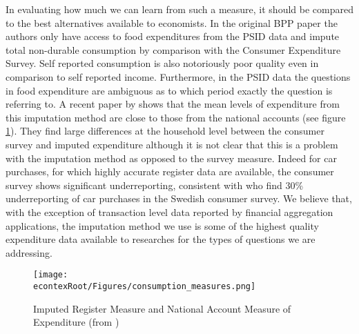 \documentclass[titlepage]{\econtex}\newcommand{\texname}{ConsumptionHeterogeneity}
\begin{document}
In evaluating how much we can learn from such a measure, it should be compared to the best alternatives available to economists. In the original BPP paper the authors only have access to food expenditures from the PSID data and impute total non-durable consumption by comparison with the Consumer Expenditure Survey. Self reported consumption is also notoriously poor quality even in comparison to self reported income. Furthermore, in the PSID data the questions in food expenditure are ambiguous as to which period exactly the question is referring to. A recent paper by \cite{abildgren_consistency_2018} shows that the mean levels of expenditure from this imputation method are close to those from the national accounts (see figure \ref{fig:ConsumptionMeasures}). They find large differences at the household level between the consumer survey and imputed expenditure although it is not clear that this is a problem with the imputation method as opposed to the survey measure. Indeed for car purchases, for which highly accurate register data are available, the consumer survey shows significant underreporting, consistent with \cite{koijen_judging_2014} who find 30\% underreporting of car purchases in the Swedish consumer survey. We believe that, with the exception of transaction level data reported by financial aggregation applications, the imputation method we use is some of the highest quality expenditure data available to researches for the types of questions we are addressing.
\begin{figure} 
	\begin{centering}
		\texttt{[image: \\econtexRoot/Figures/consumption\_measures.png]} 
		\caption{Imputed Register Measure and National Account Measure of Expenditure (from \cite{abildgren_consistency_2018})}
		\label{fig:ConsumptionMeasures}
	\end{centering}
\end{figure}
\end{document}
